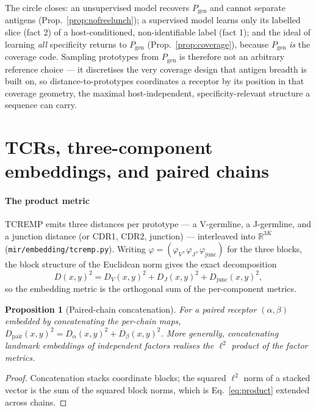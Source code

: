 \documentclass[11pt]{article}
\theoremstyle{oldplain}
\newtheorem{proposition}{Proposition}
\theoremstyle{oldrem}
\newcommand{\Pgen}{P_{\mathrm{gen}}}
\newcommand{\R}{\mathds{R}}  %
\newcommand{\junc}{\mathrm{junc}}
\newcommand{\code}[1]{\texttt{#1}}
\begin{document}
The circle closes: an unsupervised model recovers $\Pgen$ and cannot separate antigens
(Prop.~\ref{prop:nofreelunch}); a supervised model learns only its labelled slice (fact 2) of a
host-conditioned, non-identifiable label (fact 1); and the ideal of learning \emph{all} specificity returns
to $\Pgen$ (Prop.~\ref{prop:coverage}), because $\Pgen$ \emph{is} the coverage code. Sampling prototypes from
$\Pgen$ is therefore not an arbitrary reference choice --- it discretises the very coverage design that
antigen breadth is built on, so distance-to-prototypes coordinates a receptor by its position in that
coverage geometry, the maximal host-independent, specificity-relevant structure a sequence can carry.

\section{{\normalfont\scshape TCR}s, three-component embeddings, and paired chains}\label{sec:tcr}

\paragraph{The product metric} {\scshape TCREMP} emits three distances per prototype --- a V-germline, a
J-germline, and a junction distance (or CDR1, CDR2, junction) --- interleaved into $\R^{3K}$
(\code{mir/embedding/tcremp.py}). Writing $\varphi=(\varphi_V,\varphi_J,\varphi_\junc)$ for the three
blocks, the block structure of the Euclidean norm gives the exact decomposition
\begin{equation}\label{eq:product}
  D(x,y)^2 = D_V(x,y)^2 + D_J(x,y)^2 + D_\junc(x,y)^2,
\end{equation}
so the embedding metric is the orthogonal sum of the per-component metrics.

\begin{proposition}[Paired-chain concatenation]\label{prop:paired}
For a paired receptor $(\alpha,\beta)$ embedded by concatenating the per-chain maps,
$D_{\mathrm{pair}}(x,y)^2 = D_\alpha(x,y)^2 + D_\beta(x,y)^2$. More generally, concatenating landmark
embeddings of independent factors realises the $\ell^2$ product of the factor metrics.
\end{proposition}
\begin{proof}
Concatenation stacks coordinate blocks; the squared $\ell^2$ norm of a stacked vector is the sum of the
squared block norms, which is Eq.~\eqref{eq:product} extended across chains.
\end{proof}
\end{document}
